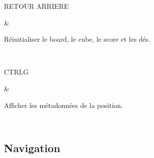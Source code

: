 \documentclass[letterpaper,10pt,french]{sphinxmanual}
\begin{document}
\begin{savenotes}
\begin{tabular}[t]{}
\sphinxhline\begin{varwidth}[t]{}
\sphinxAtStartPar
RETOUR ARRIERE
\sphinxbeforeendvarwidth
\end{varwidth}%
&\begin{varwidth}[t]{}
\sphinxAtStartPar
Réinitialiser le board, le cube, le score et les dés.
\sphinxbeforeendvarwidth
\end{varwidth}%
\\
\sphinxhline\begin{varwidth}[t]{}
\sphinxAtStartPar
CTRL\sphinxhyphen{}G
\sphinxbeforeendvarwidth
\end{varwidth}%
&\begin{varwidth}[t]{}
\sphinxAtStartPar
Afficher les métadonnées de la position.
\sphinxbeforeendvarwidth
\end{varwidth}%
\\
\sphinxbottomrule
\end{tabular}
\sphinxtableafterendhook\par
\sphinxattableend\end{savenotes}


\subsection{Navigation}
\label{\detokenize{raccourcis:navigation}}\label{\detokenize{raccourcis:raccourcis-navigation}}
\end{document}

